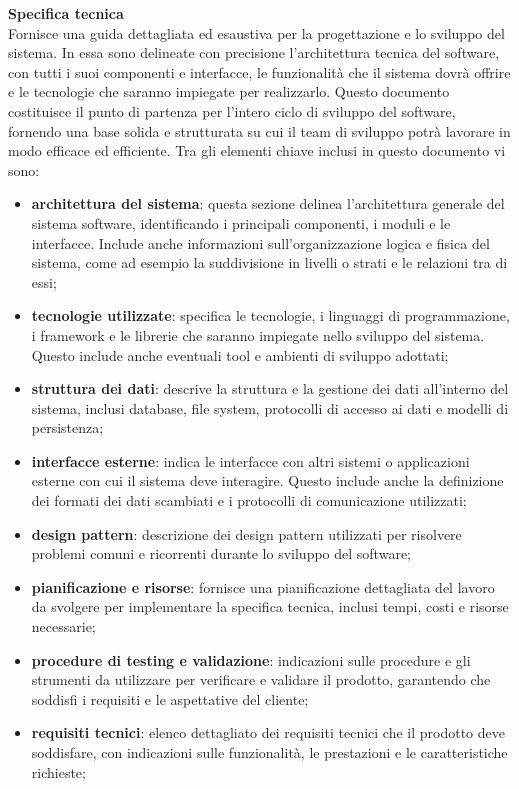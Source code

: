 \textbf{Specifica tecnica}\\ 
Fornisce una guida dettagliata ed esaustiva per la progettazione e lo sviluppo del sistema. In essa sono delineate con precisione l'architettura tecnica del software, con tutti i suoi componenti e interfacce, le funzionalità che il sistema dovrà offrire e le tecnologie che saranno impiegate per realizzarlo. Questo documento costituisce il punto di partenza per l'intero ciclo di sviluppo del software, fornendo una base solida e strutturata su cui il team di sviluppo potrà lavorare in modo efficace ed efficiente. Tra gli elementi chiave inclusi in questo documento vi sono:
\begin{itemize}
	\item \textbf{architettura del sistema}: questa sezione delinea l'architettura generale del sistema software, identificando i principali componenti, i moduli e le interfacce. Include anche informazioni sull'organizzazione logica e fisica del sistema, come ad esempio la suddivisione in livelli o strati e le relazioni tra di essi;
	\item \textbf{tecnologie utilizzate}: specifica le tecnologie, i linguaggi di programmazione, i framework e le librerie che saranno impiegate nello sviluppo del sistema. Questo include anche eventuali tool e ambienti di sviluppo adottati;
	\item \textbf{struttura dei dati}: descrive la struttura e la gestione dei dati all'interno del sistema, inclusi database, file system, protocolli di accesso ai dati e modelli di persistenza;
	\item \textbf{interfacce esterne}: indica le interfacce con altri sistemi o applicazioni esterne con cui il sistema deve interagire. Questo include anche la definizione dei formati dei dati scambiati e i protocolli di comunicazione utilizzati;
	\item \textbf{design pattern}: descrizione dei design pattern utilizzati per risolvere problemi comuni e ricorrenti durante lo sviluppo del software;
	\item \textbf{pianificazione e risorse}: fornisce una pianificazione dettagliata del lavoro da svolgere per implementare la specifica tecnica, inclusi tempi, costi e risorse necessarie;
	\item \textbf{procedure di testing e validazione}: indicazioni sulle procedure e gli strumenti da utilizzare per verificare e validare il prodotto, garantendo che soddisfi i requisiti e le aspettative del cliente;
	\item \textbf{requisiti tecnici}: elenco dettagliato dei requisiti tecnici che il prodotto deve soddisfare, con indicazioni sulle funzionalità, le prestazioni e le caratteristiche richieste;
\end{itemize}

